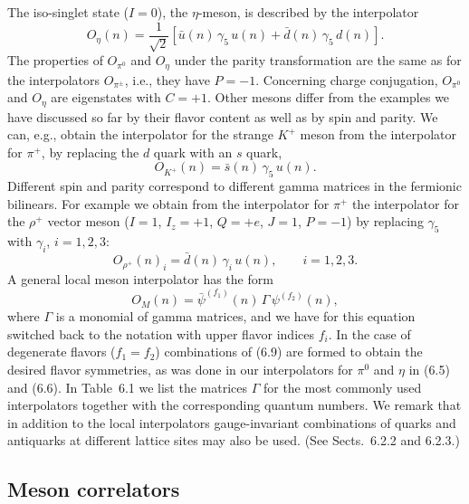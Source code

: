 The iso-singlet state ($I = 0$), the $\eta$-meson, is described by the
interpolator
\begin{equation}
  O_{\eta}(n) = \frac{1}{\sqrt{2}}\left[ \bar u(n)\, \gamma_5\, u(n)
    + \bar d(n)\, \gamma_5\, d(n) \right].
\end{equation}
The properties of $O_{\pi^0}$ and $O_\eta$ under the parity transformation are
the same as for the interpolators $O_{\pi^\pm}$, i.e., they have $P = -1$.
Concerning charge conjugation, $O_{\pi^0}$ and $O_\eta$ are eigenstates with
$C = +1$. Other mesons differ from the examples we have discussed so far by
their flavor content as well as by spin and parity. We can, e.g., obtain the
interpolator for the strange $K^+$ meson from the interpolator for $\pi^+$, by
replacing the $d$ quark with an $s$ quark,
\begin{equation}
  O_{K^+}(n) = \bar s(n)\, \gamma_5\, u(n) .
\end{equation}
Different spin and parity correspond to different gamma matrices in the
fermionic bilinears. For example we obtain from the interpolator for $\pi^+$
the interpolator for the $\rho^+$ vector meson ($I = 1$, $I_z = +1$, $Q = +e$,
$J = 1$, $P = -1$) by replacing $\gamma_5$ with $\gamma_i$, $i = 1, 2, 3$:
\begin{equation}
  O_{\rho^+}(n)_i = \bar d(n)\, \gamma_i\, u(n) , \qquad i = 1, 2, 3 .
\end{equation}
A general local meson interpolator has the form
\begin{equation}
  O_M(n) = \bar\psi^{(f_1)}(n)\, \Gamma\, \psi^{(f_2)}(n) ,
\end{equation}
where $\Gamma$ is a monomial of gamma matrices, and we have for this equation
switched back to the notation with upper flavor indices $f_i$. In the case of
degenerate flavors ($f_1 = f_2$) combinations of (6.9) are formed to obtain the
desired flavor symmetries, as was done in our interpolators for $\pi^0$ and
$\eta$ in (6.5) and (6.6). In Table~6.1 we list the matrices $\Gamma$ for the
most commonly used interpolators together with the corresponding quantum
numbers. We remark that in addition to the local interpolators gauge-invariant
combinations of quarks and antiquarks at different lattice sites may also be
used. (See Sects.~6.2.2 and 6.2.3.)

\subsection{Meson correlators}

